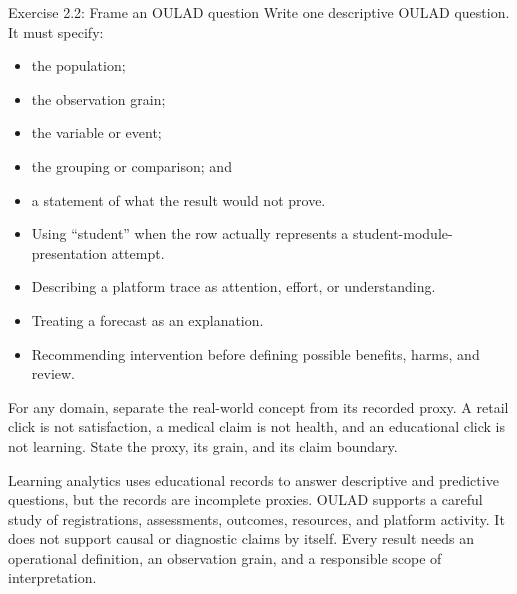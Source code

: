 \begin{exercisebox}{Exercise 2.2: Frame an OULAD question}
Write one descriptive OULAD question. It must specify:
\begin{itemize}
  \item the population;
  \item the observation grain;
  \item the variable or event;
  \item the grouping or comparison; and
  \item a statement of what the result would not prove.
\end{itemize}
\end{exercisebox}

\begin{commonmistakes}
\begin{itemize}
  \item Using ``student'' when the row actually represents a
    student-module-presentation attempt.
  \item Describing a platform trace as attention, effort, or understanding.
  \item Treating a forecast as an explanation.
  \item Recommending intervention before defining possible benefits, harms, and
    review.
\end{itemize}
\end{commonmistakes}

\transferheading
For any domain, separate the real-world concept from its recorded proxy. A
retail click is not satisfaction, a medical claim is not health, and an
educational click is not learning. State the proxy, its grain, and its claim
boundary.

\begin{summarybox}
Learning analytics uses educational records to answer descriptive and
predictive questions, but the records are incomplete proxies. OULAD supports a
careful study of registrations, assessments, outcomes, resources, and platform
activity. It does not support causal or diagnostic claims by itself. Every
result needs an operational definition, an observation grain, and a responsible
scope of interpretation.
\end{summarybox}
